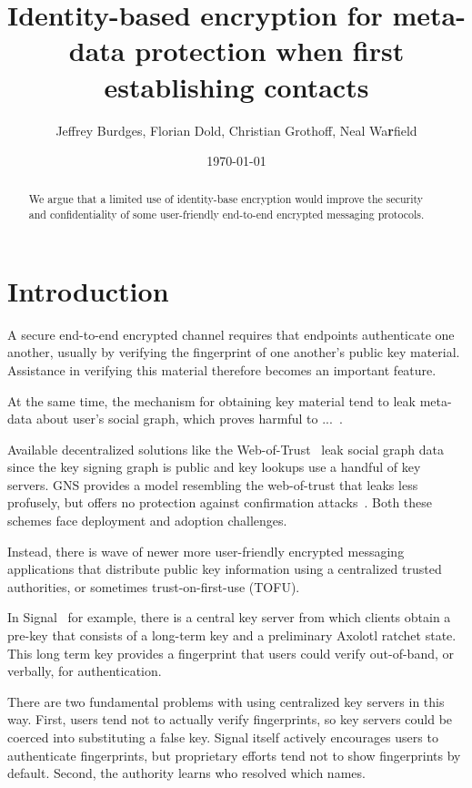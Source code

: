 \documentclass[twoside,letterpaper]{sig-alternate}
\title{Identity-based encryption for meta-data protection when first establishing contacts}
\author{Jeffrey Burdges, Florian Dold, Christian Grothoff, Neal Wa{\bf r}field}
\date{\today}
\begin{document}
\maketitle


\begin{abstract}
We argue that a limited use of identity-base encryption would improve
the security and confidentiality of some user-friendly end-to-end
encrypted messaging protocols.
\end{abstract}


\section{Introduction}


A secure end-to-end encrypted channel requires that endpoints
authenticate one another, usually by verifying the fingerprint of
one another's public key material.
Assistance in verifying this material therefore becomes an important
feature. %

At the same time, the mechanism for obtaining key material tend to
leak meta-data about user's social graph, which proves harmful to 
...~\cite{skynet,??metadatapolution??}.

Available decentralized solutions like the Web-of-Trust~\cite{wot}
leak social graph data since the key signing graph is public and
key lookups use a handful of key servers.  GNS provides a model
resembling the web-of-trust that leaks less profusely, but offers
no protection against confirmation attacks~\cite{gns}.  
Both these schemes face deployment and adoption challenges.

Instead, there is wave of newer more user-friendly encrypted messaging
applications that distribute public key information using a centralized
trusted authorities, or sometimes trust-on-first-use (TOFU). 

In Signal~\cite{TextSecure} for example, there is a central key server
from which clients obtain a pre-key that consists of a long-term key
and a preliminary Axolotl ratchet state.  
This long term key provides a fingerprint that users could verify
out-of-band, or verbally, for authentication. 

There are two fundamental problems with using centralized key servers
in this way.  
First, users tend not to actually verify fingerprints, so 
key servers could be coerced into substituting a false key.
Signal itself actively encourages users to authenticate fingerprints,
but proprietary efforts tend not to show fingerprints by default.
Second, the authority learns who resolved which names.
\end{document}
